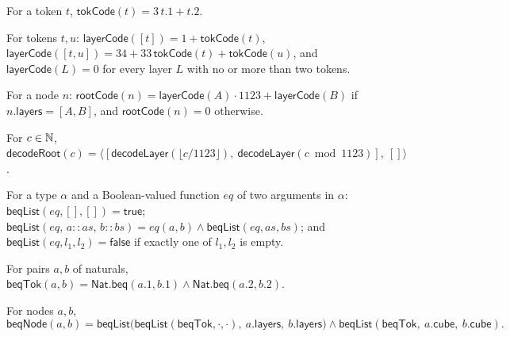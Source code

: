 \begin{definition}\label{cb:def:tokcode}
For a token $t$, $\mathsf{tokCode}(t)=3\,t.1+t.2$.
\end{definition}

\begin{definition}\label{cb:def:layercode}
For tokens $t,u$: $\mathsf{layerCode}([t])=1+\mathsf{tokCode}(t)$,
$\mathsf{layerCode}([t,u])=34+33\,\mathsf{tokCode}(t)+\mathsf{tokCode}(u)$, and $\mathsf{layerCode}(L)=0$ for every
layer $L$ with no or more than two tokens.
\end{definition}

\begin{definition}\label{cb:def:rootcode}
For a node $n$: $\mathsf{rootCode}(n)=\mathsf{layerCode}(A)\cdot1123+\mathsf{layerCode}(B)$ if
$n.\mathsf{layers}=[A,B]$, and $\mathsf{rootCode}(n)=0$ otherwise.
\end{definition}

\begin{definition}\label{cb:def:decoderoot}
For $c\in\mathbb N$, $\mathsf{decodeRoot}(c)=\big\langle[\mathsf{decodeLayer}(\lfloor c/1123\rfloor),\
\mathsf{decodeLayer}(c\bmod1123)],\ []\big\rangle$.
\end{definition}

\begin{definition}\label{cb:def:beqlist}
For a type $\alpha$ and a Boolean-valued function $eq$ of two arguments in $\alpha$:
$\mathsf{beqList}(eq,[],[])=\mathsf{true}$;
$\mathsf{beqList}(eq,\,a\mathbin{::}as,\,b\mathbin{::}bs)=eq(a,b)\wedge\mathsf{beqList}(eq,as,bs)$; and
$\mathsf{beqList}(eq,l_1,l_2)=\mathsf{false}$ if exactly one of $l_1,l_2$ is empty.
\end{definition}

\begin{definition}\label{cb:def:beqtok}
For pairs $a,b$ of naturals, $\mathsf{beqTok}(a,b)=\mathsf{Nat.beq}(a.1,b.1)\wedge\mathsf{Nat.beq}(a.2,b.2)$.
\end{definition}

\begin{definition}\label{cb:def:beqnode}
For nodes $a,b$,
\[
\mathsf{beqNode}(a,b)=\mathsf{beqList}\big(\mathsf{beqList}(\mathsf{beqTok},\cdot,\cdot),\
a.\mathsf{layers},\ b.\mathsf{layers}\big)\wedge\mathsf{beqList}(\mathsf{beqTok},\ a.\mathsf{cube},\ b.\mathsf{cube}).
\]
\end{definition}

